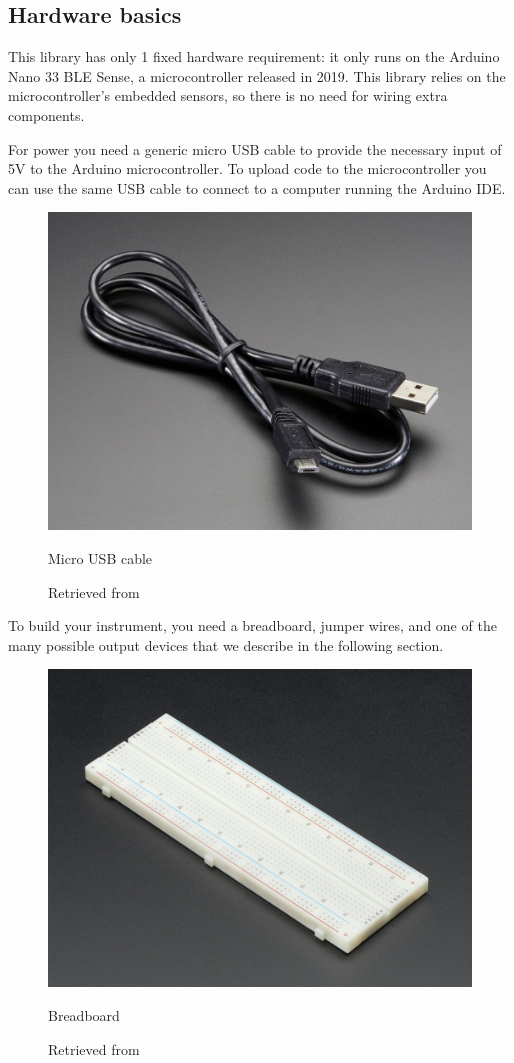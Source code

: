 \subsection{Hardware basics}

This library has only 1 fixed hardware requirement: it only runs on the Arduino Nano 33 BLE Sense, a microcontroller released in 2019. This library relies on the microcontroller's embedded sensors, so there is no need for wiring extra components.

For power you need a generic micro USB cable to provide the necessary input of 5V to the Arduino microcontroller. To upload code to the microcontroller you can use the same USB cable to connect to a computer running the Arduino IDE.

\begin{figure}[ht]
  \centering
  \includegraphics[width=0.75\linewidth,height=0.25\textheight,keepaspectratio]{images/materials-adafruit-micro-usb-cable.jpg}
  \caption{Micro USB cable}
  \caption*{Retrieved from \cite{website-materials-adafruit-micro-usb-cable}}
  \label{fig:materials-adafruit-usb-cable}
\end{figure}

To build your instrument, you need a breadboard, jumper wires, and one of the many possible output devices that we describe in the following section.

\begin{figure}[ht]
  \centering
  \includegraphics[width=0.75\linewidth,height=0.25\textheight,keepaspectratio]{images/materials-adafruit-breadboard.jpg}
  \caption{Breadboard}
  \caption*{Retrieved from \cite{website-materials-adafruit-breadboard}}
  \label{fig:materials-adafruit-breadboard}
\end{figure}

